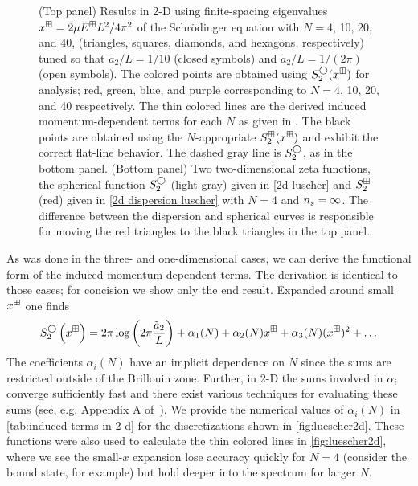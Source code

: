 \begin{figure}
    \center
    
    \caption{
        (Top panel)
        Results in 2-D using finite-spacing eigenvalues $x^\boxplus=2\mu E^\boxplus L^2/4\pi^2$ of the Schr\"odinger equation with $N=4$, 10, 20, and 40, (triangles, squares, diamonds, and hexagons, respectively) tuned so that $\tilde a_{2}/L=1/10$ (closed symbols) and $\tilde a_{2}/L=1/(2\pi)$ (open symbols).
        The colored points are obtained using $S^\bigcirc_2(x^\boxplus)$ for analysis; red, green, blue, and purple corresponding to $N=4$, 10, 20, and 40 respectively.
        The thin colored lines are the derived induced momentum-dependent terms for each $N$ as given in .
        The black points are obtained using the $N$-appropriate $S^{\boxplus}_2(x^\boxplus)$ and exhibit the correct flat-line behavior.
        The dashed gray line is $S_2^\bigcirc$, as in the bottom panel.
        (Bottom panel)
        Two two-dimensional zeta functions, the spherical function $S_2^{\bigcirc}$ (light gray) given in \eqref{2d luscher} and $S_2^{\boxplus}$ (red) given in \eqref{2d dispersion luscher} with $N=4$ and ${n_s}=\infty$.
        The difference between the dispersion and spherical curves is responsible for moving the red triangles to the black triangles in the top panel.
        }
    \label{fig:luescher2d}
\end{figure}

As was done in the three- and one-dimensional cases, we can derive the functional form of the induced momentum-dependent terms.
The derivation is identical to those cases; for concision we show only the end result.
Expanded around small $x^\boxplus$ one finds
\begin{equation}
    \label{eq:2D corrections}
    S^\bigcirc_{2}\left(x^\boxplus\right)
    =
    2\pi\log\left(2\pi \frac{\tilde a_{2}}{L}\right)
    + \alpha_1(N)
    + \alpha_2(N) x^\boxplus
    + \alpha_3(N) (x^\boxplus)^2
    + \ldots
\end{equation}
The coefficients $\alpha_i(N)$ have an implicit dependence on $N$ since the sums are restricted outside of the Brillouin zone.  Further, in 2-D the sums involved in $\alpha_i$ converge sufficiently fast and there exist various techniques for evaluating these sums (see, e.g. Appendix A of~\cite{Fiebig:1994qi}).
We provide the numerical values of $\alpha_i(N)$ in \autoref{tab:induced terms in 2 d} for the discretizations shown in \autoref{fig:luescher2d}.
These functions were also used to calculate the thin colored lines in \autoref{fig:luescher2d}, where we see the small-$x$ expansion lose accuracy quickly for $N=4$ (consider the bound state, for example) but hold deeper into the spectrum for larger $N$.

